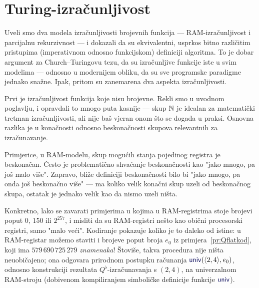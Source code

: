 \chapter{Turing-izračunljivost}\label{ch:Turing}


Uveli smo dva modela izračunljivosti brojevnih funkcija --- RAM-izračunljivost i parcijalnu rekurzivnost --- i dokazali da su ekvivalentni, usprkos bitno različitim pristupima (imperativnom odnosno funkcijskom) definiciji algoritma. To je dobar argument za Church--\!Turingovu tezu, da su izračunljive funkcije iste u svim modelima --- odnosno u modernijem obliku, da su sve programske paradigme jednako snažne. Ipak, pritom su zanemarena dva aspekta izračunljivosti.


Prvi je izračunljivost funkcija koje nisu brojevne. Rekli smo u uvodnom poglavlju, i opravdali to mnogo puta kasnije --- skup ${\mathbb N}$ je idealan za matematički tretman izračunljivosti, ali nije baš vjeran onom što se događa u praksi. Osnovna razlika je u konačnosti odnosno beskonačnosti skupova relevantnih za izračunavanje.

Primjerice, u RAM-modelu, skup mogućih stanja pojedinog registra je beskonačan. Često je problematično shvaćanje beskonačnosti kao "jako mnogo, pa još malo više". Zapravo, bliže definiciji beskonačnosti bilo bi "jako mnogo, pa onda još beskonačno više" --- ma koliko velik konačni skup uzeli od beskonačnog skupa, ostatak je jednako velik kao da nismo uzeli ništa.

Konkretno, lako se zavarati primjerima u kojima u RAM-registrima stoje brojevi poput $0$, $150$ ili $2^{257}$, i misliti da su RAM-registri nešto kao obični procesorski registri, samo "malo veći". Kodiranje pokazuje koliko je to daleko od istine: u RAM-registar možemo staviti i brojeve poput broja $e_0$ iz primjera~\ref{pr:Qflatkod}, koji ima $579\,690\,725\,279$ \emph{znamenaka}! Štoviše, takva procedura nije ništa neuobičajeno; ona odgovara prirodnom postupku računanja $\f{univ}(\kr{2,4},e_0)$, odnosno konstrukciji rezultata $Q^\flat$-izračunavanja s $(2,4)$, na univerzalnom RAM-stroju (dobivenom kompiliranjem simboličke definicije funkcije $\f{univ}$).

